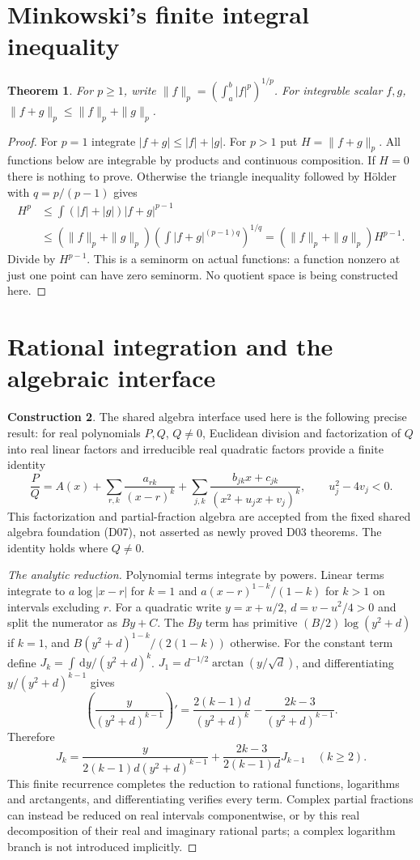 \documentclass[11pt,oneside,a4paper]{book}
\newtheorem{theorem}{Theorem}[chapter]
\theoremstyle{definition}
\newtheorem{construction}[theorem]{Construction}
\theoremstyle{remark}
\newcommand{\dd}{\,\mathrm d}
\newcommand{\KEntry}[2]{\Needspace{7\baselineskip}\section{#2}\label{#1}{\small\sffamily\color{black!60}\detokenize{#1}}\par}
\begin{document}
\KEntry{K03.09.minkowski}{Minkowski's finite integral inequality}
\begin{theorem}
For $p\ge1$, write $\|f\|_p=(\int_a^b|f|^p)^{1/p}$.
For integrable scalar $f,g$, $\|f+g\|_p\le\|f\|_p+\|g\|_p$.
\end{theorem}
\begin{proof}
For $p=1$ integrate $|f+g|\le|f|+|g|$.
For $p>1$ put $H=\|f+g\|_p$. All functions below are integrable
by products and continuous composition. If $H=0$ there is nothing to
prove. Otherwise the triangle inequality followed by H\"older with
$q=p/(p-1)$ gives
\begin{align*}
H^p&\le\int(|f|+|g|)|f+g|^{p-1}\\
&\le(\|f\|_p+\|g\|_p)
\left(\int|f+g|^{(p-1)q}\right)^{1/q}
=(\|f\|_p+\|g\|_p)H^{p-1}.
\end{align*}
Divide by $H^{p-1}$. This is a seminorm on actual functions: a function
nonzero at just one point can have zero seminorm. No quotient space is
being constructed here.
\end{proof}

\KEntry{K03.09.partial_fractions}{Rational integration and the algebraic interface}
\begin{construction}
The shared algebra interface used here is the following precise result:
for real polynomials $P,Q$, $Q\ne0$, Euclidean division and factorization
of $Q$ into real linear factors and irreducible real quadratic factors
provide a finite identity
\[\frac P Q=A(x)+\sum_{r,k}\frac{a_{rk}}{(x-r)^k}
+\sum_{j,k}\frac{b_{jk}x+c_{jk}}{(x^2+u_jx+v_j)^k},
\qquad u_j^2-4v_j<0.
\]
This factorization and partial-fraction algebra are accepted from the
fixed shared algebra foundation (D07), not asserted as newly proved D03
theorems. The identity holds where $Q\ne0$.
\end{construction}
\begin{proof}[The analytic reduction]
Polynomial terms integrate by powers. Linear terms integrate to
$a\log|x-r|$ for $k=1$ and
$a(x-r)^{1-k}/(1-k)$ for $k>1$ on intervals excluding $r$.
For a quadratic write $y=x+u/2$, $d=v-u^2/4>0$ and split the numerator
as $By+C$. The $By$ term has primitive
$(B/2)\log(y^2+d)$ if $k=1$, and
$B(y^2+d)^{1-k}/(2(1-k))$ otherwise.
For the constant term define $J_k=\int\dd y/(y^2+d)^k$.
$J_1=d^{-1/2}\arctan(y/\sqrt d)$, and differentiating
$y/(y^2+d)^{k-1}$ gives
\[\left(\frac{y}{(y^2+d)^{k-1}}\right)'
=\frac{2(k-1)d}{(y^2+d)^k}-\frac{2k-3}{(y^2+d)^{k-1}}.
\]
Therefore
\[J_k=\frac{y}{2(k-1)d(y^2+d)^{k-1}}
+\frac{2k-3}{2(k-1)d}J_{k-1}\quad(k\ge2).
\]
This finite recurrence completes the reduction to rational functions,
logarithms and arctangents, and differentiating verifies every term.
Complex partial fractions can instead be reduced on real intervals
componentwise, or by this real decomposition of their real and imaginary
rational parts; a complex logarithm branch is not introduced implicitly.
\end{proof}
\end{document}
